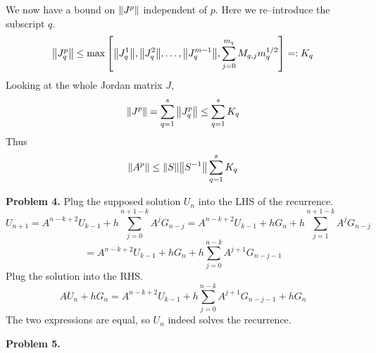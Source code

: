 \documentclass{article}
\def\tbf#1{\textbf{#1}}
\newcommand{\sbr}[1]{\left[#1\right]}
\newcommand{\inv}{^{-1}}
\newcommand{\sep}[1][.5cm]{\vspace{#1}}
\begin{document}
We now have a bound on $\norm{J^p}$ independent of $p$. Here we re--introduce the subscript $q$.
$$\norm{J_q^p} \le \max\sbr{\norm{J_q^1},\norm{J_q^2},\dots,\norm{J_q^{m-1}},\sum_{j=0}^{m_q} M_{q,j} m_q^{1/2}} =: K_q$$
Looking at the whole Jordan matrix $J$,
$$\norm{J^p} = \sum_{q=1}^s \norm{J_q^p} \le \sum_{q=1}^s K_q$$
Thus
$$\norm{A^p} \le \norm{S}\norm{S\inv} \sum_{q=1}^s K_q$$
\sep



\tbf{Problem 4.} Plug the supposed solution $U_n$ into the LHS of the recurrence.
$$U_{n+1} = A^{n-k+2}U_{k-1} + h\sum_{j=0}^{n+1-k}A^jG_{n-j}
= A^{n-k+2}U_{k-1} + hG_n + h\sum_{j=1}^{n+1-k}A^jG_{n-j}$$
$$= A^{n-k+2}U_{k-1} + hG_n + h\sum_{j=0}^{n-k}A^{j+1}G_{n-j-1}$$
Plug the solution into the RHS.
$$AU_n + hG_n = A^{n-k+2}U_{k-1} + h\sum_{j=0}^{n-k}A^{j+1}G_{n-j-1} + hG_n$$
The two expressions are equal, so $U_n$ indeed solves the recurrence.
\sep



\tbf{Problem 5.}
\end{document}
